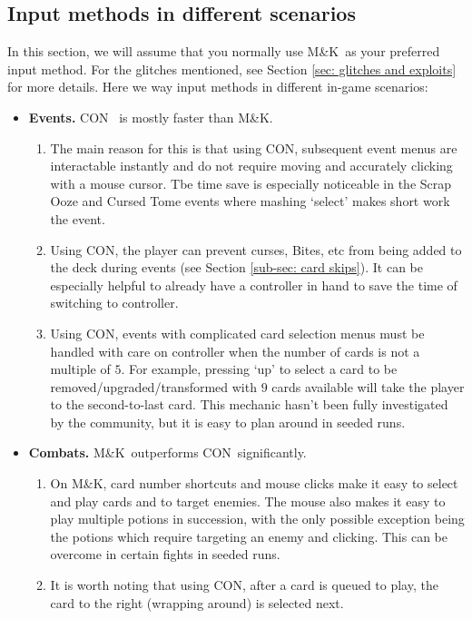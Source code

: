 \documentclass[12pt]{amsart}
\newcommand{\mk}{\textsf{M\&K}}
\newcommand{\con}{\textsf{CON}}
\begin{document}
\subsection{Input methods in different scenarios}
In this section, we will assume that you normally use \mk~as your preferred input method.  
For the glitches mentioned, see Section \ref{sec: glitches and exploits} for more details.  
Here we way input methods in different in-game scenarios: 
\begin{itemize}
	\item 
	    \textbf{Events.  }
	        \con~ is mostly faster than \mk.  
	\begin{enumerate}[-]
		\item 
			The main reason for this is that using \con, subsequent event menus are interactable instantly and do not require moving and accurately clicking with a mouse cursor.  
			Tbe time save is especially noticeable in the Scrap Ooze and Cursed Tome events where mashing `select' makes short work the event.  
	    \item 
	        Using \con, the player can prevent curses, Bites, etc from being added to the deck during events (see Section \ref{sub-sec: card skips}).  
	        It can be especially helpful to already have a controller in hand to save the time of switching to controller.  
		\item 
		    Using \con, events with complicated card selection menus must be handled with care on controller when the number of cards is not a multiple of $5$.  
		    For example, pressing `up' to select a card to be removed/upgraded/transformed with $9$ cards available will take the player to the second-to-last card.  
		    This mechanic hasn't been fully investigated by the community, but it is easy to plan around in seeded runs.  
	\end{enumerate}
	\item 
	    \textbf{Combats.  }
		\mk~outperforms \con~significantly.  
		\begin{enumerate}[-]
			\item 
			    On \mk, card number shortcuts and mouse clicks make it easy to select and play cards and to target enemies.  
			    The mouse also makes it easy to play multiple potions in succession, with the only possible exception being the potions which require targeting an enemy and clicking.  
			    This can be overcome in certain fights in seeded runs.  
		\item 
		    It is worth noting that using \con, after a card is queued to play, the card to the right (wrapping around) is selected next.  

\end{enumerate}
\end{itemize}
\end{document}
